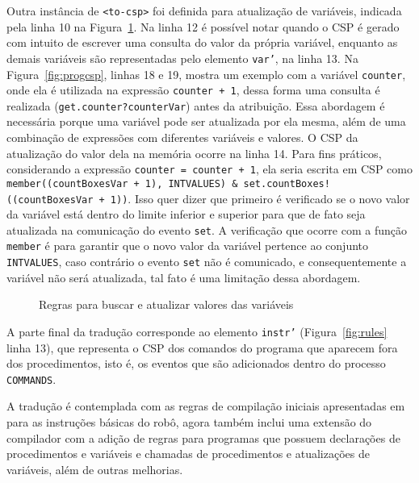 Outra instância de \texttt{<to-csp>} foi definida para atualização de variáveis, indicada pela linha 10 na Figura~\ref{fig:rules_var}. Na linha 12 é possível notar quando o CSP é gerado com intuito de escrever uma consulta do valor da própria variável, enquanto as demais variáveis são representadas pelo elemento \texttt{var'}, na linha 13. Na Figura~\ref{fig:progcsp}, linhas 18 e 19, mostra um exemplo com a variável \texttt{counter}, onde ela é utilizada na expressão \texttt{counter + 1}, dessa forma uma consulta é realizada (\texttt{get.counter?counterVar}) antes da atribuição. Essa abordagem é necessária porque uma variável pode ser atualizada por ela mesma, além de uma combinação de expressões com diferentes variáveis e valores. O CSP da atualização do valor dela na memória ocorre na linha 14. Para fins práticos, considerando a expressão \texttt{counter = counter + 1}, ela seria escrita em CSP como \texttt{member((countBoxesVar + 1), INTVALUES) \& set.countBoxes!((countBoxesVar + 1))}. Isso quer dizer que primeiro é verificado se o novo valor da variável está dentro do limite inferior e superior para que de fato seja atualizada na comunicação do evento \texttt{set}. A verificação que ocorre com a função \texttt{member} é para garantir que o novo valor da variável pertence ao conjunto \texttt{INTVALUES}, caso contrário o evento \texttt{set} não é comunicado, e consequentemente a variável não será atualizada, tal fato é uma limitação dessa abordagem.

\begin{figure}[!h]
\centering
\caption{Regras para buscar e atualizar valores das variáveis}

\label{fig:rules_var}
\end{figure}


A parte final da tradução corresponde ao elemento \texttt{instr'} (Figura~\ref{fig:rules} linha 13), que representa o CSP dos comandos do programa que aparecem fora dos procedimentos, isto é, os eventos que são adicionados dentro do processo \texttt{COMMANDS}.

A tradução é contemplada com as regras de compilação iniciais apresentadas em \cite{nogueira} para as instruções básicas do robô, agora também inclui uma extensão do compilador com a adição de regras para programas que possuem declarações de procedimentos e variáveis e chamadas de procedimentos e atualizações de variáveis, além de outras melhorias.


